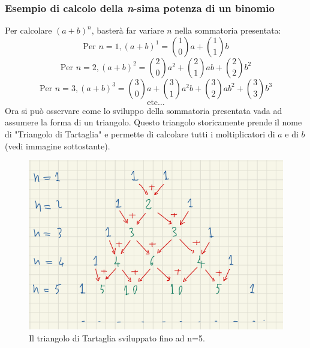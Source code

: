 \documentclass[12pt]{article}
\begin{document}
\subsubsection{Esempio di calcolo della \textit{n}-sima potenza di un binomio}
Per calcolare $(a+b)^n$, basterà far variare $n$ nella sommatoria presentata:
\[
    \text{Per } n=1, (a + b)^1 = \binom{1}{0}a + \binom{1}{1}b
\]
\[
    \text{Per } n=2, (a + b)^2 = \binom{2}{0}a^2 + \binom{2}{1}ab + \binom{2}{2}b^2
\]
\[
    \text{Per } n=3, (a + b)^3 = \binom{3}{0}a + \binom{3}{1}a^2b + \binom{3}{2}ab^2 + \binom{3}{3}b^3
\]
\[
    \text{etc} \dots
\]
Ora si può osservare come lo sviluppo della sommatoria presentata vada ad assumere la forma di un triangolo. Questo triangolo storicamente prende il nome di "Triangolo di Tartaglia" e permette di calcolare tutti i moltiplicatori di $a$ e di $b$ (vedi immagine sottostante).
\begin{figure}[!htb]
    \centering
    \includegraphics[width=1\textwidth, height=.7\textheight,keepaspectratio]{tartaglia.PNG} %
    \begin{center}
        \caption{\label{fig:tartaglia}Il triangolo di Tartaglia sviluppato fino ad n=5.} %
    \end{center}
\end{figure}
\end{document}
